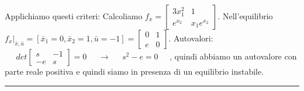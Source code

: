 Applichiamo questi criteri:\newline
Calcoliamo $f_x = \left[\begin{matrix}
    3x_1^2 & 1 \\
    e^{x_2} & x_1 e^{x_2}
\end{matrix}\right]$. \newline
Nell'equilibrio $f_x |_{\bar{x}, \bar{u}}=  [\bar{x}_1 = 0, \bar{x}_2 = 1, \bar{u} = -1] = \left[\begin{matrix}
    0 & 1 \\ e & 0
\end{matrix}\right]$.\newline
Autovalori: $\;\;\;\;\;det \left[\begin{matrix}
    s & -1 \\ -e & s
\end{matrix}\right] = 0 \;\;\;\;\; \rightarrow  \;\;\;\;\; s^2 - e = 0 \;\;\;\;\;$, quindi abbiamo un autovalore con parte reale positiva e quindi siamo in presenza di un equilibrio instabile.\newline
\rule{\textwidth}{0,4pt}
